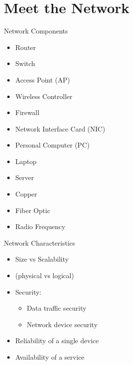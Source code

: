 \section[meet]{Meet the Network}

\begin{frame}{Network Components}
	\begin{itemize}[<2->]
		\item Router
		\item Switch
		\item Access Point (AP)
		\item Wireless Controller
		\item Firewall
		\item Network Interface Card (NIC)
	\end{itemize}
	\begin{itemize}[<3->]
		\item Personal Computer (PC)
		\item Laptop
		\item Server
	\end{itemize}
	\begin{itemize}[<4->]
		\item Copper
		\item Fiber Optic
		\item Radio Frequency
	\end{itemize}
\end{frame}

\begin{frame}{Network Characteristics}
	\begin{itemize}[<+->]
		\item Size vs Scalability
		\item {} (physical vs logical)
		\item Security:
		\begin{itemize}
			\item Data traffic security
			\item Network device security
		\end{itemize}
		\item Reliability of a single device
		\item Availability of a service
	\end{itemize}
\end{frame}

